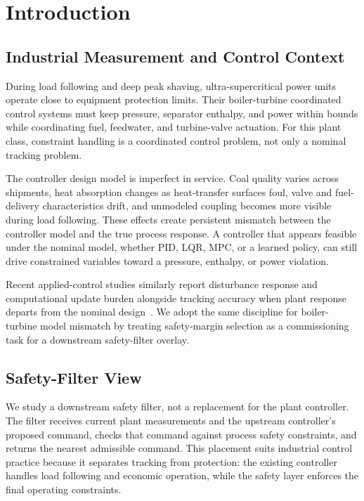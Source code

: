 \section{Introduction}
\label{sec:intro}

\subsection{Industrial Measurement and Control Context}

During load following and deep peak shaving, ultra-supercritical power units operate close to equipment protection limits. Their boiler-turbine coordinated control systems must keep pressure, separator enthalpy, and power within bounds while coordinating fuel, feedwater, and turbine-valve actuation. For this plant class, constraint handling is a coordinated control problem, not only a nominal tracking problem.

The controller design model is imperfect in service. Coal quality varies across shipments, heat absorption changes as heat-transfer surfaces foul, valve and fuel-delivery characteristics drift, and unmodeled coupling becomes more visible during load following. These effects create persistent mismatch between the controller model and the true process response. A controller that appears feasible under the nominal model, whether PID, LQR, MPC, or a learned policy, can still drive constrained variables toward a pressure, enthalpy, or power violation.

Recent applied-control studies similarly report disturbance response and computational update burden alongside tracking accuracy when plant response departs from the nominal design~\cite{wu2026pressure,feng2026event}. We adopt the same discipline for boiler-turbine model mismatch by treating safety-margin selection as a commissioning task for a downstream safety-filter overlay.

\subsection{Safety-Filter View}

We study a downstream safety filter, not a replacement for the plant controller. The filter receives current plant measurements and the upstream controller's proposed command, checks that command against process safety constraints, and returns the nearest admissible command. This placement suits industrial control practice because it separates tracking from protection: the existing controller handles load following and economic operation, while the safety layer enforces the final operating constraints.

